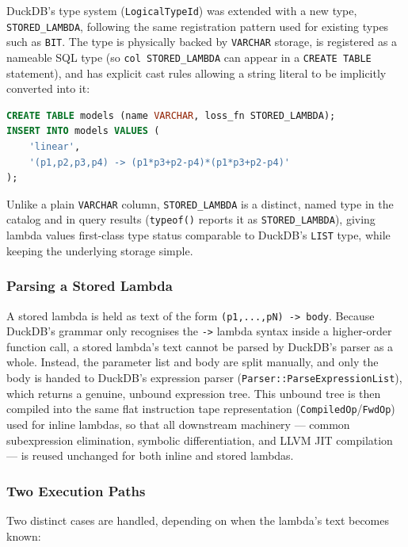 \documentclass[12pt]{report}
\begin{document}
DuckDB's type system (\texttt{LogicalTypeId}) was extended with a new type,
\texttt{STORED\_LAMBDA}, following the same registration pattern used for
existing types such as \texttt{BIT}. The type is physically backed by
\texttt{VARCHAR} storage, is registered as a nameable SQL type (so
\texttt{col STORED\_LAMBDA} can appear in a \texttt{CREATE TABLE} statement),
and has explicit cast rules allowing a string literal to be implicitly
converted into it:

\begin{lstlisting}[language=SQL]
CREATE TABLE models (name VARCHAR, loss_fn STORED_LAMBDA);
INSERT INTO models VALUES (
    'linear',
    '(p1,p2,p3,p4) -> (p1*p3+p2-p4)*(p1*p3+p2-p4)'
);
\end{lstlisting}

Unlike a plain \texttt{VARCHAR} column, \texttt{STORED\_LAMBDA} is a distinct,
named type in the catalog and in query results (\texttt{typeof()} reports it
as \texttt{STORED\_LAMBDA}), giving lambda values first-class type status
comparable to DuckDB's \texttt{LIST} type, while keeping the underlying
storage simple.

\subsubsection{Parsing a Stored Lambda}

A stored lambda is held as text of the form \texttt{(p1,...,pN) -> body}.
Because DuckDB's grammar only recognises the \texttt{->} lambda syntax inside
a higher-order function call, a stored lambda's text cannot be parsed by
DuckDB's parser as a whole. Instead, the parameter list and body are split
manually, and only the body is handed to DuckDB's expression parser
(\texttt{Parser::ParseExpressionList}), which returns a genuine, unbound
expression tree. This unbound tree is then compiled into the same flat
instruction tape representation (\texttt{CompiledOp}/\texttt{FwdOp}) used for
inline lambdas, so that all downstream machinery --- common subexpression
elimination, symbolic differentiation, and LLVM JIT compilation --- is
reused unchanged for both inline and stored lambdas.

\subsubsection{Two Execution Paths}

Two distinct cases are handled, depending on when the lambda's text becomes
known:
\end{document}

